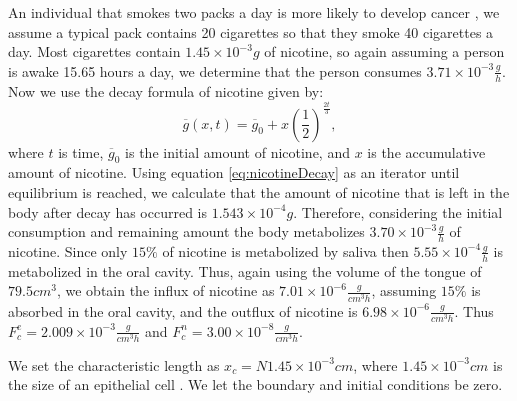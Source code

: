 \documentclass[\main/thesis.tex]{subfiles}
\begin{document}
An individual that smokes two packs a day is more likely to develop cancer \cite{merckmanuals.com_2021}, we assume a typical pack contains 20 cigarettes so that they smoke 40 cigarettes a day. Most cigarettes contain $1.45{\times}10^{\minus 3} g$ of nicotine, so again assuming a person is awake 15.65 hours a day, we determine that the person consumes $3.71{\times}10^{\minus 3} \frac{g}{h}$. Now we use the decay formula of nicotine given by:
\begin{equation}
    \overline{g}(x, t) {=} \overline{g}_0 {+} x \left( \frac{1}{2} \right)^{\frac{2t}{3}},
    \label{eq:nicotineDecay}
\end{equation}
where $t$ is time, $\overline{g}_0$ is the initial amount of nicotine, and $x$ is the accumulative amount of nicotine. Using equation \eqref{eq:nicotineDecay} as an iterator until equilibrium is reached, we calculate that the amount of nicotine that is left in the body after decay has occurred is $1.543{\times}10^{\minus 4} g$. Therefore, considering the initial consumption and remaining amount the body metabolizes $3.70{\times}10^{\minus 3} \frac{g}{h}$ of nicotine. 
Since only $15\%$ of nicotine is metabolized by saliva then $5.55{\times}10^{\minus 4} \frac{g}{h}$ is metabolized in the oral cavity. Thus, again using the volume of the tongue of $79.5cm^3$, we obtain the influx of nicotine as $7.01{\times}10^{-6} \frac{g}{cm^3 h}$, assuming $15\%$ is absorbed in the oral cavity, and the outflux of nicotine is $6.98{\times}10^{-6} \frac{g}{cm^3 h}$. Thus $F_c^e {=} 2.009 {\times} 10^{\minus 3} \frac{g}{cm^3 h}$ and $F_c^n {=} 3.00 {\times}10^{\minus 8} \frac{g}{cm^3 h}$.

We set the characteristic length as $x_c {=} N 1.45{\times}10^{-3} cm$, where \newline $1.45{\times}10^{-3} cm$ is the size of an epithelial cell \cite{bionumbers.hms.harvard.edu_2022}. We let the boundary and initial conditions be zero. 
\end{document}
